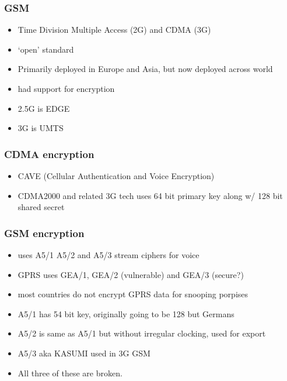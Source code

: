 \documentclass{beamer}
\begin{document}
\begin{frame}
  \frametitle{GSM}
  \begin{itemize}
    \item Time Division Multiple Access (2G) and CDMA (3G)
    \item `open' standard
    \item Primarily deployed in Europe and Asia, but now deployed across world
    \item had support for encryption
    \item 2.5G is EDGE
    \item 3G is UMTS
  \end{itemize}
\end{frame}



\begin{frame}
  \frametitle{CDMA encryption}
  \begin{itemize}
    \item CAVE (Cellular Authentication and Voice Encryption)
    \item CDMA2000 and related 3G tech uses 64 bit primary key along w/ 128 bit shared secret
  \end{itemize}
\end{frame}

\begin{frame}
  \frametitle{GSM encryption}
  \begin{itemize}
    \item uses A5/1 A5/2 and A5/3 stream ciphers for voice
    \item GPRS uses GEA/1, GEA/2 (vulnerable) and GEA/3 (secure?)
    \item most countries do not encrypt GPRS data for snooping porpises
    \item A5/1 has 54 bit key, originally going to be 128 but Germans
    \item A5/2 is same as A5/1 but without irregular clocking, used for export
    \item A5/3 aka KASUMI used in 3G GSM
    \item All three of these are broken.
  \end{itemize}
\end{frame}
\end{document}
